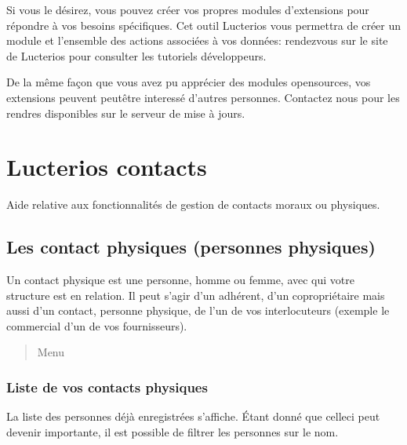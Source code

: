 \documentclass[letterpaper,10pt,french]{sphinxmanual}
\begin{document}
Si vous le désirez, vous pouvez créer vos propres modules d’extensions pour répondre à vos besoins spécifiques.
Cet outil Lucterios vous permettra de créer un module et l’ensemble des actions associées à vos données: rendez\sphinxhyphen{}vous sur le site de Lucterios pour consulter les tutoriels développeurs.

De la même façon que vous avez pu apprécier des modules open\sphinxhyphen{}sources, vos extensions peuvent peut\sphinxhyphen{}être interessé d’autres personnes.
Contactez nous pour les rendres disponibles sur le serveur de mise à jours.
\begin{quote}


\end{quote}


\chapter{Lucterios contacts}
\label{\detokenize{contacts/index:lucterios-contacts}}\label{\detokenize{contacts/index::doc}}
Aide relative aux fonctionnalités de gestion de contacts moraux ou physiques.


\section{Les contact physiques (personnes physiques)}
\label{\detokenize{contacts/individual:les-contact-physiques-personnes-physiques}}\label{\detokenize{contacts/individual::doc}}
Un contact physique est une personne, homme ou femme, avec qui votre structure est en relation. Il peut s’agir d’un adhérent, d’un copropriétaire mais aussi d’un contact, personne physique, de l’un de vos interlocuteurs (exemple le commercial d’un de vos fournisseurs).
\begin{quote}

Menu 
\end{quote}


\subsection{Liste de vos contacts physiques}
\label{\detokenize{contacts/individual:liste-de-vos-contacts-physiques}}
La liste des personnes déjà enregistrées s’affiche. Étant donné que celle\sphinxhyphen{}ci peut devenir importante, il est possible de filtrer les personnes sur le nom.
\end{document}
